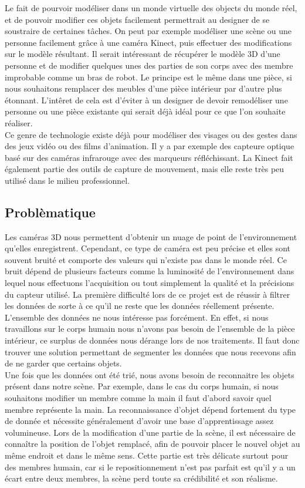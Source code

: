 Le fait de pourvoir modéliser dans un monde virtuelle des objects du monde réel, et de pouvoir modifier ces 
objets facilement permettrait au designer de se soustraire de certaines tâches. On peut par exemple modéliser
une scène ou une personne facilement grâce à une caméra Kinect, puis effectuer des modifications sur le modèle résultant. Il serait
intéressant de récupérer le modèle 3D d'une personne et de modifier quelques unes des parties de son corps avec
des membre improbable comme un bras de robot. Le principe est le même dans une pièce, si nous souhaitons remplacer
des meubles d'une pièce intérieur par d'autre plus étonnant. L'intêret de cela est d'éviter à un designer de 
devoir remodéliser une personne ou une pièce existante qui serait déjà idéal pour ce que l'on souhaite réaliser.\\

Ce genre de technologie existe déjà pour modéliser des visages ou des gestes dans des jeux vidéo ou des films d'animation. 
Il y a par exemple des capteure optique basé sur des caméras infrarouge avec des marqueurs réfléchissant. La Kinect fait
également partie des outils de capture de mouvement, mais elle reste très peu utilisé dans le milieu professionnel.

\subsection{Problèmatique}
Les caméras 3D nous permettent d'obtenir un nuage de point de l'environnement qu'elles enregistrent. Cependant, ce 
type de caméra est peu précise et elles sont souvent bruité et comporte des valeurs qui n'existe pas dans le monde 
réel. Ce bruit dépend de plusieurs facteurs comme la luminosité de l'environnement dans lequel nous effectuons l'acquisition
ou tout simplement la qualité et la précisions du capteur utilisé. La première difficulté lors de ce projet est de réussir 
à filtrer les données de sorte à ce qu'il ne reste que les données réellement présente.
L'ensemble des données ne nous intéresse pas forcément. En effet, si nous travaillons sur le corps humain nous n'avons
pas besoin de l'ensemble de la pièce intérieur, ce surplus de données nous dérange lors de nos traitements. Il faut
donc trouver une solution permettant de segmenter les données que nous recevons afin de ne garder que certains objets.\\ 
 
Une fois que les données ont été trié, nous avons besoin de reconnaitre les objets présent dans notre scène. Par exemple, dans
le cas du corps humain, si nous souhaitons modifier un membre comme la main il faut d'abord savoir quel membre représente 
la main. La reconnaissance d'objet dépend fortement du type de donnée et nécessite généralement d'avoir une base d'apprentissage 
assez volumineuse. Lors de la modification d'une partie de la scène, il est nécessaire de connaître la position de l'objet remplacé, afin de pouvoir
placer le nouvel objet au même endroit et dans le même sens. Cette partie est très délicate surtout pour des membres humain, car
si le repositionnement n'est pas parfait est qu'il y a un écart entre deux membres, la scène perd toute sa crédibilité et son 
réalisme.\\

